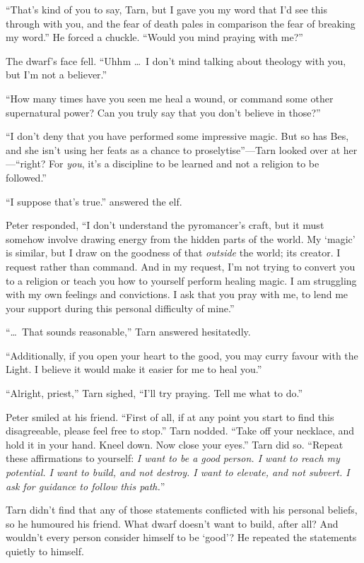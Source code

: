 ``That's kind of you to say, Tarn, but I gave you my word that I'd see this through with you, and the fear of death pales in comparison the fear of breaking my word.''  He forced a chuckle.  ``Would you mind praying with me?''

The dwarf's face fell.  ``Uhhm \ldots\ I don't mind talking about theology with you, but I'm not a believer.''

``How many times have you seen me heal a wound, or command some other supernatural power?  Can you truly say that you don't believe in those?''

``I don't deny that you have performed some impressive magic.  But so has Bes, and she isn't using her feats as a chance to proselytise''---Tarn looked over at her---``right?  For \emph{you}, it's a discipline to be learned and not a religion to be followed.''

``I suppose that's true.'' answered the elf.

Peter responded, ``I don't understand the pyromancer's craft, but it must somehow involve drawing energy from the hidden parts of the world.  My `magic' is similar, but I draw on the goodness of that \emph{outside} the world; its creator.  I request rather than command.  And in my request, I'm not trying to convert you to a religion or teach you how to yourself perform healing magic.  I am struggling with my own feelings and convictions. I ask that you pray with me, to lend me your support during this personal difficulty of mine.''

``\ldots\ That sounds reasonable,'' Tarn answered hesitatedly.

``Additionally, if you open your heart to the good, you may curry favour with the Light.  I believe it would make it easier for me to heal you.''

``Alright, priest,'' Tarn sighed, ``I'll try praying.  Tell me what to do.''

Peter smiled at his friend.  ``First of all, if at any point you start to find this disagreeable, please feel free to stop.''  Tarn nodded.  ``Take off your necklace, and hold it in your hand.  Kneel down.  Now close your eyes.''  Tarn did so.  ``Repeat these affirmations to yourself: \emph{I want to be a good person.  I want to reach my potential.  I want to build, and not destroy.  I want to elevate, and not subvert.  I ask for guidance to follow this path.}''

Tarn didn't find that any of those statements conflicted with his personal beliefs, so he humoured his friend.  What dwarf doesn't want to build, after all?  And wouldn't every person consider himself to be `good'?  He repeated the statements quietly to himself.

